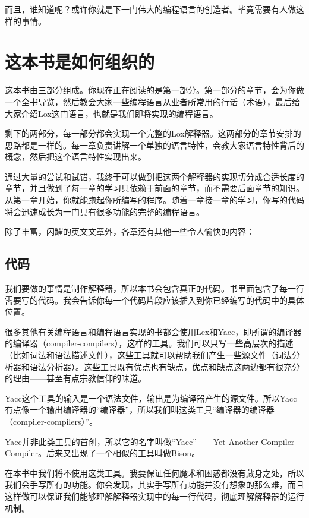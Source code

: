 \documentclass[cn,10pt,math=newtx,citestyle=gb7714-2015,bibstyle=gb7714-2015]{elegantbook}
\begin{document}
而且，谁知道呢？或许你就是下一门伟大的编程语言的创造者。毕竟需要有人做这样的事情。

\section{这本书是如何组织的}

这本书由三部分组成。你现在正在阅读的是第一部分。第一部分的章节，会为你做一个全书导览，然后教会大家一些编程语言从业者所常用的行话（术语），最后给大家介绍Lox这门语言，也就是我们即将实现的编程语言。

剩下的两部分，每一部分都会实现一个完整的Lox解释器。这两部分的章节安排的思路都是一样的。每一章负责讲解一个单独的语言特性，会教大家语言特性背后的概念，然后把这个语言特性实现出来。

通过大量的尝试和试错，我终于可以做到把这两个解释器的实现切分成合适长度的章节，并且做到了每一章的学习只依赖于前面的章节，而不需要后面章节的知识。从第一章开始，你就能跑起你所编写的程序。随着一章接一章的学习，你写的代码将会迅速成长为一门具有很多功能的完整的编程语言。

除了丰富，闪耀的英文文章外，各章还有其他一些令人愉快的内容：

\subsection{代码}

我们要做的事情是制作解释器，所以本书会包含真正的代码。书里面包含了每一行需要写的代码。我会告诉你每一个代码片段应该插入到你已经编写的代码中的具体位置。

很多其他有关编程语言和编程语言实现的书都会使用Lex和Yacc，即所谓的编译器的编译器（compiler-compilers），这样的工具。我们可以只写一些高层次的描述（比如词法和语法描述文件），这些工具就可以帮助我们产生一些源文件（词法分析器和语法分析器）。这些工具既有优点也有缺点，优点和缺点这两边都有很充分的理由——甚至有点宗教信仰的味道。

\begin{tcolorbox}
Yacc这个工具的输入是一个语法文件，输出是为编译器产生的源文件。所以Yacc有点像一个输出编译器的“编译器”，所以我们叫这类工具“编译器的编译器（compiler-compilers）”。

Yacc并非此类工具的首创，所以它的名字叫做“Yacc”——Yet Another Compiler-Compiler。后来又出现了一个相似的工具叫做Bison。
\end{tcolorbox}

在本书中我们将不使用这类工具。我要保证任何魔术和困惑都没有藏身之处，所以我们会手写所有的功能。你会发现，其实手写所有功能并没有想象的那么难，而且这样做可以保证我们能够理解解释器实现中的每一行代码，彻底理解解释器的运行机制。
\end{document}
